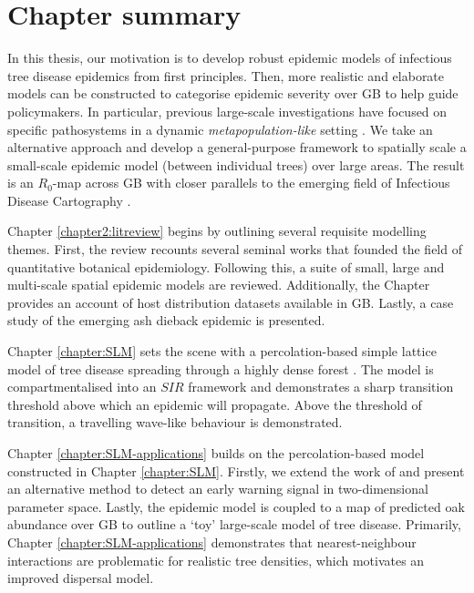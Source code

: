 \section{Chapter summary}

In this thesis, our motivation is to develop robust epidemic models of infectious tree disease
epidemics from first principles. Then, more realistic and elaborate models can be constructed to
categorise epidemic severity over GB to help guide policymakers. 
In particular, previous large-scale investigations
have focused on specific pathosystems in a dynamic \textit{metapopulation-like} setting
\cite{large-scale-control, meentemeyer2011epidemiological, harwood2009epidemiological}. We take
an alternative approach and develop a general-purpose framework to spatially scale a small-scale epidemic
model (between individual trees) over large areas. The result is an $R_0$-map across GB with closer parallels
to the emerging field of Infectious Disease Cartography \cite{otieno2021modeling, KRAEMER201619, messina2016mapping}.

Chapter \ref{chapter2:litreview} begins by outlining several requisite modelling themes. First, the review recounts
several seminal works that founded the field of quantitative botanical epidemiology. Following this,
a suite of small, large and multi-scale spatial epidemic models are reviewed. Additionally,
the Chapter provides an account of host distribution datasets available in GB. Lastly, a case study of the emerging
ash dieback epidemic is presented.

Chapter \ref{chapter:SLM} sets the scene with a percolation-based simple lattice model of tree
disease spreading through a highly dense forest \cite{OROZCOFUENTES201912}. The model is compartmentalised
into an $SIR$ framework and demonstrates a sharp transition threshold above which an epidemic will propagate. 
Above the threshold of transition, a travelling wave-like behaviour is demonstrated.

Chapter \ref{chapter:SLM-applications} builds on the percolation-based model constructed in Chapter \ref{chapter:SLM}.
Firstly, we extend the work of \cite{OROZCOFUENTES201912} and present an alternative method to detect an early
warning signal in two-dimensional parameter space. Lastly, the epidemic model is coupled to a map of predicted
oak abundance over GB \cite{hill.data} to outline a `toy' large-scale model of tree disease. 
Primarily, Chapter \ref{chapter:SLM-applications} demonstrates that nearest-neighbour interactions are problematic
for realistic tree densities, which motivates an improved dispersal model. 

